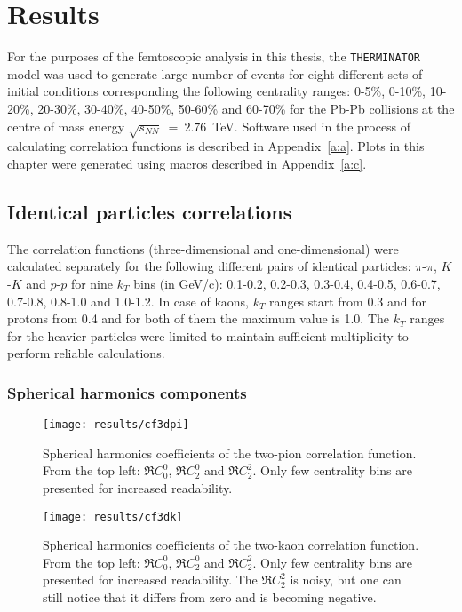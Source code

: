 \chapter{Results}
  For the purposes of the femtoscopic analysis in this thesis, the \verb|THERMINATOR| model was used to generate large number of events for eight different sets of initial conditions corresponding the following centrality ranges: 0-5\%, 0-10\%, 10-20\%, 20-30\%, 30-40\%, 40-50\%, 50-60\% and 60-70\% for the Pb-Pb collisions at the centre of mass energy $\sqrt{s_{NN}}~=~2.76$~TeV.
  Software used in the process of calculating correlation functions is described in Appendix~\ref{a:a}.
  Plots in this chapter were generated using macros described in Appendix~\ref{a:c}.
  \section{Identical particles correlations}
    The correlation functions (three-dimensional and one-dimensional) were calculated separately for the following different pairs of identical particles: $\pi$-$\pi$, $K$-$K$ and  $p$-$p$ for nine $k_T$ bins (in GeV/c): 0.1-0.2, 0.2-0.3, 0.3-0.4, 0.4-0.5, 0.6-0.7, 0.7-0.8, 0.8-1.0 and 1.0-1.2.
    In case of kaons, $k_T$ ranges start from 0.3 and for protons from 0.4 and for both of them the maximum value is 1.0.
    The $k_T$ ranges for the heavier particles were limited to maintain sufficient multiplicity to perform reliable calculations.
    \subsection{Spherical harmonics components}

      \begin{figure}[b]
        \centering
        \centerline{\texttt{[image: results/cf3dpi]}}
        \caption{Spherical harmonics coefficients of the two-pion correlation function. From the top left: $\Re C^0_0$, $\Re C^0_2$ and $\Re C^2_2$. Only few centrality bins are presented for increased readability.}
      \label{fig:cf3dpi}
      \end{figure}

      \begin{figure}[b]
        \centering
        \centerline{\texttt{[image: results/cf3dk]}}
        \caption{Spherical harmonics coefficients of the two-kaon correlation function. From the top left: $\Re C^0_0$, $\Re C^0_2$ and $\Re C^2_2$. Only few centrality bins are presented for increased readability. The $\Re C^2_2$ is noisy, but one can still notice that it differs from zero and is becoming negative.}
      \label{fig:cf3dk}
      \end{figure} 

